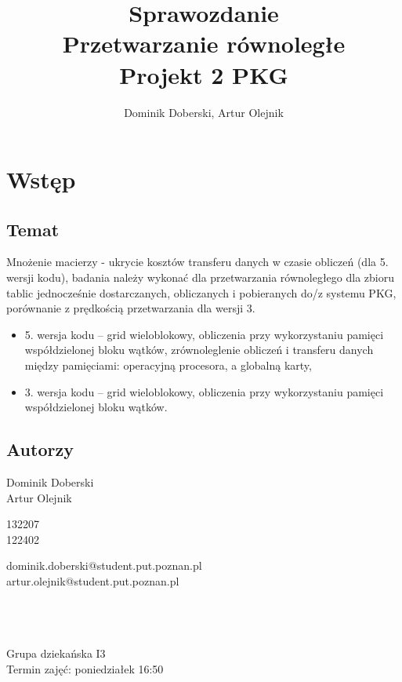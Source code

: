\documentclass{article}
\author{Dominik Doberski, Artur Olejnik}
\title{
\huge Sprawozdanie 
\\Przetwarzanie równoległe\\
\Huge Projekt 2 PKG}
\begin{document}
\maketitle

\section{Wstęp}
\subsection{Temat}

Mnożenie macierzy - ukrycie kosztów transferu danych w czasie obliczeń (dla 5. wersji kodu), badania należy wykonać dla przetwarzania równoległego dla zbioru tablic jednocześnie dostarczanych, obliczanych i pobieranych do/z systemu PKG, porównanie z prędkością przetwarzania dla wersji 3.
\begin{itemize}
\item 5. wersja kodu -- grid wieloblokowy, obliczenia przy wykorzystaniu pamięci współdzielonej bloku wątków, zrównoleglenie obliczeń i transferu danych między pamięciami: operacyjną procesora, a globalną karty,
\item 3. wersja kodu -- grid wieloblokowy, obliczenia przy wykorzystaniu pamięci współdzielonej bloku wątków.
\end{itemize}
\subsection{Autorzy}
\begin{minipage}[t]{0.3\textwidth}
Dominik Doberski\\
Artur Olejnik
\end{minipage}
\begin{minipage}[t]{0.15\textwidth}
132207\\
122402
\end{minipage}
\begin{minipage}[t]{0.55\textwidth}
dominik.doberski@student.put.poznan.pl\\
artur.olejnik@student.put.poznan.pl
\end{minipage}
\\\\\\
Grupa dziekańska I3\\
Termin zajęć: poniedziałek 16:50 
\end{document}
